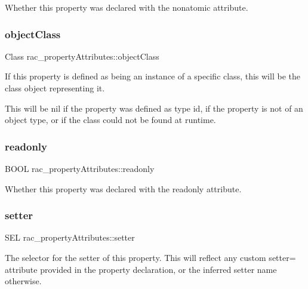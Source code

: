 Whether this property was declared with the {\ttfamily nonatomic} attribute. \mbox{\label{structrac__property_attributes_a73053fdbc4bc9014ccb6148b05b74521}} 
\subsubsection{\texorpdfstring{object\+Class}{objectClass}}
{\footnotesize\ttfamily Class rac\+\_\+property\+Attributes\+::object\+Class}

If this property is defined as being an instance of a specific class, this will be the class object representing it.

This will be {\ttfamily nil} if the property was defined as type {\ttfamily id}, if the property is not of an object type, or if the class could not be found at runtime. \mbox{\label{structrac__property_attributes_abb7d2cfe35836a37e19bba2982a9f063}} 
\subsubsection{\texorpdfstring{readonly}{readonly}}
{\footnotesize\ttfamily B\+O\+OL rac\+\_\+property\+Attributes\+::readonly}

Whether this property was declared with the {\ttfamily readonly} attribute. \mbox{\label{structrac__property_attributes_ab23ef6a9f0a4efe6546a63ff716556ae}} 
\subsubsection{\texorpdfstring{setter}{setter}}
{\footnotesize\ttfamily S\+EL rac\+\_\+property\+Attributes\+::setter}

The selector for the setter of this property. This will reflect any custom {\ttfamily setter=} attribute provided in the property declaration, or the inferred setter name otherwise.

